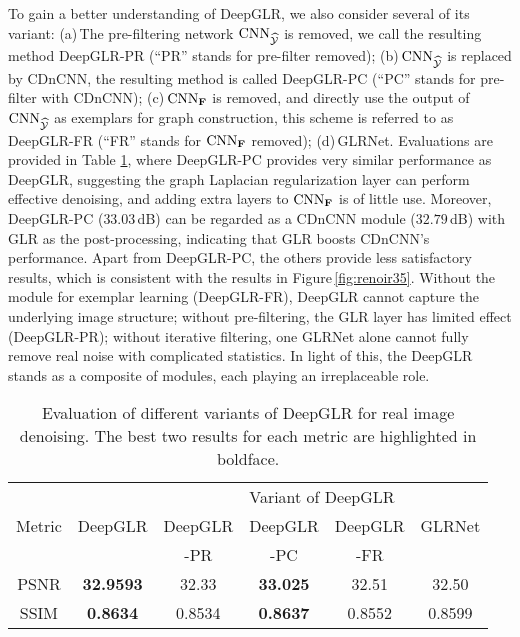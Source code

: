 \documentclass[10pt,twocolumn,letterpaper]{article}
\begin{document}
To gain a better understanding of DeepGLR, we also consider several of its variant: (a)\,The pre-filtering network ${\rm CNN}_{\widehat{\cal Y}}$ is removed, we call the resulting method DeepGLR-PR (``PR'' stands for pre-filter removed); (b)\,${\rm CNN}_{\widehat{\cal Y}}$ is replaced by CDnCNN, the resulting method is called DeepGLR-PC (``PC'' stands for pre-filter with CDnCNN); (c)\,${\rm CNN}_{\bf F}$ is removed, and directly use the output of ${\rm CNN}_{\widehat{\cal Y}}$ as exemplars for graph construction, this scheme is referred to as DeepGLR-FR (``FR'' stands for ${\rm CNN}_{\bf F}$ removed); (d)\,GLRNet. 
Evaluations are provided in Table \ref{tab:ablation}, where DeepGLR-PC provides very similar performance as DeepGLR, suggesting the graph Laplacian regularization layer can perform effective denoising, and adding extra layers to ${\rm CNN}_{\bf F}$ is of little use. 
Moreover, DeepGLR-PC ($33.03$\,dB) can be regarded as a CDnCNN module ($32.79$\,dB) with GLR as the post-processing, indicating that GLR boosts CDnCNN's performance. 
Apart from DeepGLR-PC, the others provide less satisfactory results, which is consistent with the results in Figure\,\ref{fig:renoir35}. 
Without the module for exemplar learning (DeepGLR-FR), DeepGLR cannot capture the underlying image structure; without pre-filtering, the GLR layer has limited effect (DeepGLR-PR); without iterative filtering, one GLRNet alone cannot fully remove real noise with complicated statistics. 
In light of this, the DeepGLR stands as a composite of modules, each playing an irreplaceable role.

\begin{table}[t]
  \centering 
  \caption{Evaluation of different variants of DeepGLR for real image denoising. The best two results for each metric are highlighted in boldface.}
  \scriptsize
    \begin{tabular}{c||c||c|c|c|c}  
    \hline
    \multirow{3}[4]{*}{Metric} & \multirow{3}[4]{*}{DeepGLR} & \multicolumn{4}{c}{Variant of DeepGLR} \\
\cline{3-6}          &       & DeepGLR & DeepGLR & DeepGLR & GLRNet\\
 &       & -PR & -PC & -FR & \\
\cline{3-6}
    \hline
    \hline
    PSNR  & \textbf{32.9593} & 32.33 & \textbf{33.025} & 32.51 & 32.50 \\
    \hline
    SSIM  & \textbf{0.8634} & 0.8534 & \textbf{0.8637} & 0.8552 & 0.8599 \\
    \hline
    \end{tabular}%
  \label{tab:ablation}%
\end{table}%
\end{document}
